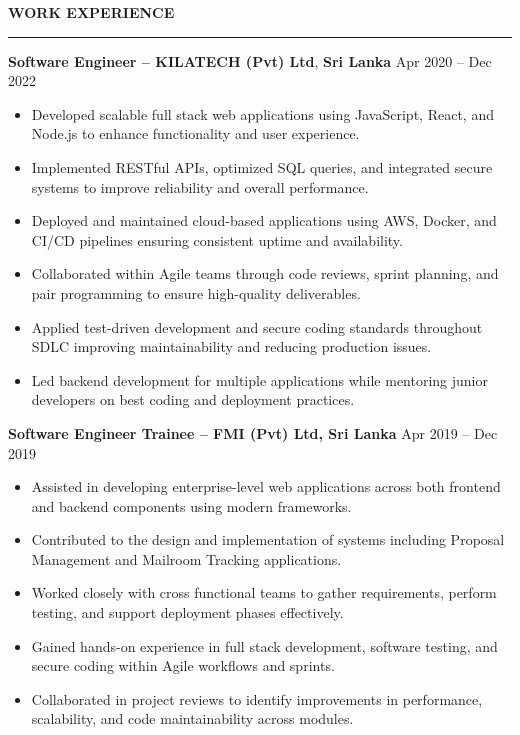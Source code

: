 \documentclass[10pt,letterpaper]{article}
\begin{document}
\vspace{8pt}

\textbf{WORK EXPERIENCE}\\[-8pt]
\noindent\rule{\textwidth}{1pt}

\vspace{-2pt}

\textbf{Software Engineer -- KILATECH (Pvt) Ltd}, \textbf{Sri Lanka} \hfill Apr 2020 -- Dec 2022

\vspace{-1pt}

\begin{itemize}
\item Developed scalable full stack web applications using JavaScript, React, and Node.js to enhance functionality and user experience.
\item Implemented RESTful APIs, optimized SQL queries, and integrated secure systems to improve reliability and overall performance.
\item Deployed and maintained cloud-based applications using AWS, Docker, and CI/CD pipelines ensuring consistent uptime and availability.
\item Collaborated within Agile teams through code reviews, sprint planning, and pair programming to ensure high-quality deliverables.
\item Applied test-driven development and secure coding standards throughout SDLC improving maintainability and reducing production issues.
\item Led backend development for multiple applications while mentoring junior developers on best coding and deployment practices.
\end{itemize}

\textbf{Software Engineer Trainee -- FMI (Pvt) Ltd, Sri Lanka} \hfill Apr 2019 -- Dec 2019

\vspace{-1pt}

\begin{itemize}
\item Assisted in developing enterprise-level web applications across both frontend and backend components using modern frameworks.
\item Contributed to the design and implementation of systems including Proposal Management and Mailroom Tracking applications.
\item Worked closely with cross functional teams to gather requirements, perform testing, and support deployment phases effectively.
\item Gained hands-on experience in full stack development, software testing, and secure coding within Agile workflows and sprints.
\item Collaborated in project reviews to identify improvements in performance, scalability, and code maintainability across modules.
\end{itemize}
\end{document}
